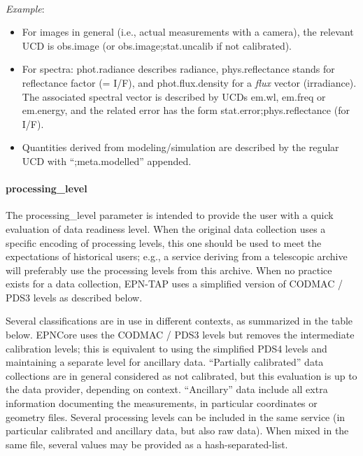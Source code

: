 \documentclass[11pt,a4paper]{ivoa}
\begin{document}
\textbf{\\}
\emph{Example}:

\begin{itemize}
\item For images in general (i.e., actual measurements with a camera),
the relevant UCD is obs.image (or obs.image;stat.uncalib if not
calibrated).

\item For spectra: phot.radiance describes radiance, phys.reflectance
stands for reflectance factor (= I/F), and phot.flux.density for a
\emph{flux} vector (irradiance). The associated spectral vector is
described by UCDs em.wl, em.freq or em.energy, and the related error
has the form stat.error;phys.reflectance (for I/F).

\item Quantities derived from modeling/simulation are described by the
regular UCD with ``;meta.modelled'' appended.
\end{itemize}

\paragraph{processing\_level}

The processing\_level parameter is intended to provide the user with
a quick evaluation of data readiness level. When the original data collection
uses a specific encoding of processing levels, this one should be used
to meet the expectations of historical users; e.g., a service deriving
from a telescopic archive will preferably use the processing levels
from this archive. When no practice exists for a data collection, EPN-TAP uses
a simplified version of CODMAC / PDS3 levels as described below.

Several classifications are in use in different contexts, as summarized
in the table below.  EPNCore uses the CODMAC / PDS3 levels but removes
the intermediate calibration levels; this is equivalent to using the
simplified PDS4 levels and maintaining a separate level for ancillary
data. ``Partially calibrated'' data collections are in general considered as not
calibrated, but this evaluation is up to the data provider, depending on
context. ``Ancillary'' data include all extra information documenting
the measurements, in particular coordinates or geometry files. Several
processing levels can be included in the same service (in particular
calibrated and ancillary data, but also raw data). When mixed in the
same file, several values may be provided as a hash-separated-list.
\end{document}
